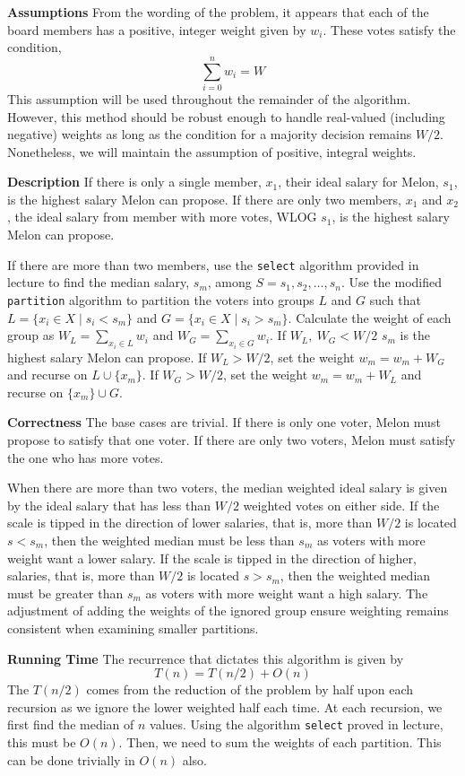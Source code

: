 \documentclass[12pt,twoside]{article}
\begin{document}
\begin{problems}
\begin{problemparts}
\textbf{Assumptions} From the wording of the problem, it appears that each of
the board members has a positive, integer weight given by $w_i$. These votes
satisfy the condition,
$$ \sum_{i = 0}^{n} w_i = W $$
This assumption will be used throughout the remainder of the algorithm. However,
this method should be robust enough to handle real-valued (including negative)
weights as long as the condition for a majority decision remains $W / 2$.
Nonetheless, we will maintain the assumption of positive, integral weights.

\textbf{Description} If there is only a single member, $x_1$, their ideal
salary for Melon, $s_1$, is the highest salary Melon can propose. If there are
only two members, $x_1$ and $x_2$, the ideal salary from member with more votes,
WLOG $s_1$, is the highest salary Melon can propose. 

If there are more than two members, use the \texttt{select} algorithm provided
in lecture to find the median salary, $s_m$, among $S = s_1, s_2, \ldots, s_n$.
Use the modified \texttt{partition} algorithm to partition the voters into
groups $L$ and $G$ such that $L = \{x_i \in X \mid s_i < s_m\}$ and $G = \{x_i
\in X \mid s_i >  s_m\}$. Calculate the weight of each group as $W_L =
\sum_{x_i \in L} w_i$ and $W_G = \sum_{x_i \in G} w_i$. If $W_L,\ W_G < W / 2$
$s_m$ is the highest salary Melon can propose. If $W_L > W / 2$, set the weight
$w_m = w_m + W_G$ and recurse on $L \cup \{x_m\}$. If $W_G > W / 2$, set the
weight $w_m = w_m + W_L$ and recurse on $\{x_m\} \cup G$.

\textbf{Correctness} The base cases are trivial. If there is only one voter,
Melon must propose to satisfy that one voter. If there are only two voters,
Melon must satisfy the one who has more votes.

When there are more than two voters, the median weighted ideal salary is given
by the ideal salary that has less than $W / 2$ weighted votes on either side.
If the scale is tipped in the direction of lower salaries, that is, more than
$W / 2$ is located $s < s_m$, then the weighted median must be less than $s_m$
as voters with more weight want a lower salary. If the scale is tipped in the
direction of higher, salaries, that is, more than $W / 2$ is located $s > s_m$,
then the weighted median must be greater than $s_m$ as voters with more weight
want a high salary. The adjustment of adding the weights of the ignored group
ensure weighting remains consistent when examining smaller partitions.

\textbf{Running Time} The recurrence that dictates this algorithm is given by
$$ T(n) = T(n / 2) + O(n) $$
The $T(n / 2)$ comes from the reduction of the problem by half upon each
recursion as we ignore the lower weighted half each time. At each recursion, we
first find the median of $n$ values. Using the algorithm \texttt{select}
proved in lecture, this must be $O(n)$. Then, we need to sum the weights of
each partition. This can be done trivially in $O(n)$ also.


\end{problemparts}
\end{problems}
\end{document}
